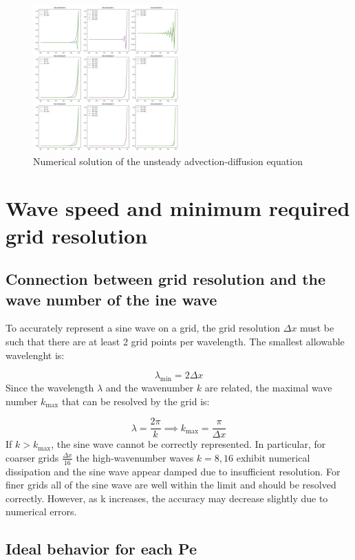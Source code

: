 \documentclass{article}
\begin{document}
\begin{figure}[h!]
  \centering
  \includegraphics[width=0.5\textwidth]{task4.png}
  \caption{Numerical solution of the unsteady advection-diffusion equation}
  \label{fig:Numerical solution of the unsteady advection-diffusion equation}
\end{figure}


\section{Wave speed and minimum required grid resolution}

\subsection{Connection between grid resolution and the wave number of the ine wave}

To accurately represent a sine wave on a grid, the grid resolution $\Delta x$ must be such that there are at least 2 grid points per wavelength.
The smallest allowable wavelenght is:

\[
\lambda_{\text{min}} = 2 \Delta x
\]
Since the wavelength $\lambda$ and the wavenumber $k$ are related, the maximal wave number $k_{\text{max}}$ that can be resolved by the grid is:

\[
\lambda = \frac{2\pi}{k} \implies k_{\text{max}} = \frac{\pi}{\Delta x}
\]
If \( k > k_{\text{max}} \), the sine wave cannot be correctly represented. In particular, for coarser grids $\frac{\Delta x}{16}$ the 
high-wavenumber waves \( k = 8, 16 \) exhibit numerical dissipation and the sine wave appear damped due to insufficient resolution. For finer
grids all of the sine wave are well within the limit and should be resolved correctly. However, as k increases, the accuracy may decrease slightly
due to numerical errors.

\subsection{Ideal behavior for each Pe}
\end{document}

